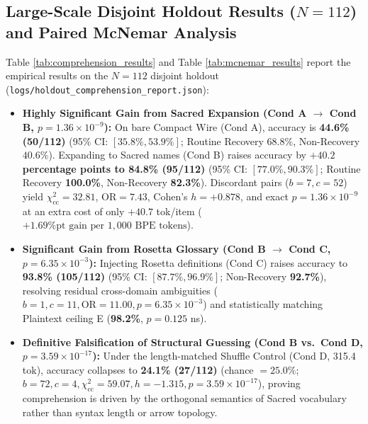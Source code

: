 \documentclass[9pt,a4paper]{extarticle}
\begin{document}
\subsection{Large-Scale Disjoint Holdout Results ($N = 112$) and Paired McNemar Analysis}
Table \ref{tab:comprehension_results} and Table \ref{tab:mcnemar_results} report the empirical results on the $N=112$ disjoint holdout (\texttt{logs/holdout\_comprehension\_report.json}):
\begin{itemize}
  \item \textbf{Highly Significant Gain from Sacred Expansion (Cond A $\rightarrow$ Cond B, $p = 1.36 \times 10^{-9}$):} On bare Compact Wire (Cond A), accuracy is \textbf{44.6\% (50/112)} (95\% CI: $[35.8\%, 53.9\%]$; Routine Recovery $68.8\%$, Non-Recovery $40.6\%$). Expanding to Sacred names (Cond B) raises accuracy by \textbf{$+40.2$ percentage points to 84.8\% (95/112)} (95\% CI: $[77.0\%, 90.3\%]$; Routine Recovery \textbf{100.0\%}, Non-Recovery \textbf{82.3\%}). Discordant pairs ($b=7, c=52$) yield $\chi^2_{\text{cc}} = 32.81$, $\text{OR} = 7.43$, Cohen's $h = +0.878$, and exact \textbf{$p = 1.36 \times 10^{-9}$} at an extra cost of only $+40.7$ tok/item (\textbf{$+1.69\text{\%pt gain per } 1{,}000\text{ BPE tokens}$}).
  \item \textbf{Significant Gain from Rosetta Glossary (Cond B $\rightarrow$ Cond C, $p = 6.35 \times 10^{-3}$):} Injecting Rosetta definitions (Cond C) raises accuracy to \textbf{93.8\% (105/112)} (95\% CI: $[87.7\%, 96.9\%]$; Non-Recovery \textbf{92.7\%}), resolving residual cross-domain ambiguities ($b=1, c=11, \text{OR}=11.00, p = 6.35 \times 10^{-3}$) and statistically matching Plaintext ceiling E (\textbf{98.2\%}, $p=0.125$ ns).
  \item \textbf{Definitive Falsification of Structural Guessing (Cond B vs.\ Cond D, $p = 3.59 \times 10^{-17}$):} Under the length-matched Shuffle Control (Cond D, 315.4 tok), accuracy collapses to \textbf{24.1\% (27/112)} (chance $= 25.0\%$; $b=72, c=4, \chi^2_{\text{cc}} = 59.07, h = -1.315, p = 3.59 \times 10^{-17}$), proving comprehension is driven by the orthogonal semantics of Sacred vocabulary rather than syntax length or arrow topology.
\end{itemize}
\end{document}
